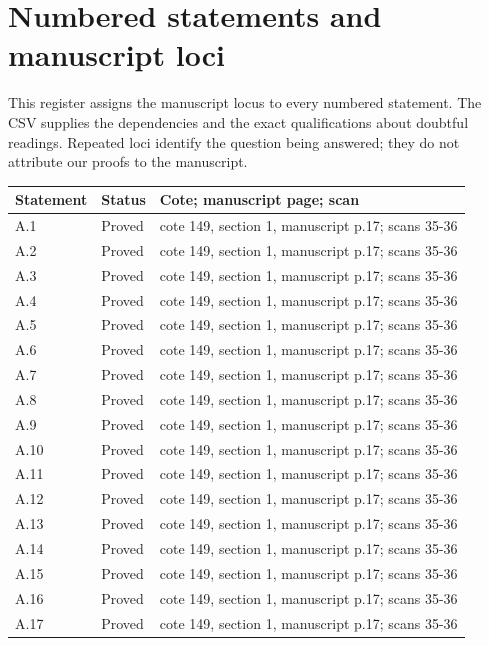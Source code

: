 \section*{Numbered statements and manuscript loci}
This register assigns the manuscript locus to every numbered statement. The CSV supplies the dependencies and the exact qualifications about doubtful readings. Repeated loci identify the question being answered; they do not attribute our proofs to the manuscript.
{\small
\begin{longtable}{p{1.9cm}p{1.7cm}p{10.3cm}}
\toprule Statement & Status & Cote; manuscript page; scan \\ \midrule\endhead
A.1 & Proved & cote 149, section 1, manuscript p.17; scans 35-36 \\
A.2 & Proved & cote 149, section 1, manuscript p.17; scans 35-36 \\
A.3 & Proved & cote 149, section 1, manuscript p.17; scans 35-36 \\
A.4 & Proved & cote 149, section 1, manuscript p.17; scans 35-36 \\
A.5 & Proved & cote 149, section 1, manuscript p.17; scans 35-36 \\
A.6 & Proved & cote 149, section 1, manuscript p.17; scans 35-36 \\
A.7 & Proved & cote 149, section 1, manuscript p.17; scans 35-36 \\
A.8 & Proved & cote 149, section 1, manuscript p.17; scans 35-36 \\
A.9 & Proved & cote 149, section 1, manuscript p.17; scans 35-36 \\
A.10 & Proved & cote 149, section 1, manuscript p.17; scans 35-36 \\
A.11 & Proved & cote 149, section 1, manuscript p.17; scans 35-36 \\
A.12 & Proved & cote 149, section 1, manuscript p.17; scans 35-36 \\
A.13 & Proved & cote 149, section 1, manuscript p.17; scans 35-36 \\
A.14 & Proved & cote 149, section 1, manuscript p.17; scans 35-36 \\
A.15 & Proved & cote 149, section 1, manuscript p.17; scans 35-36 \\
A.16 & Proved & cote 149, section 1, manuscript p.17; scans 35-36 \\
A.17 & Proved & cote 149, section 1, manuscript p.17; scans 35-36 \\

\end{longtable}}
